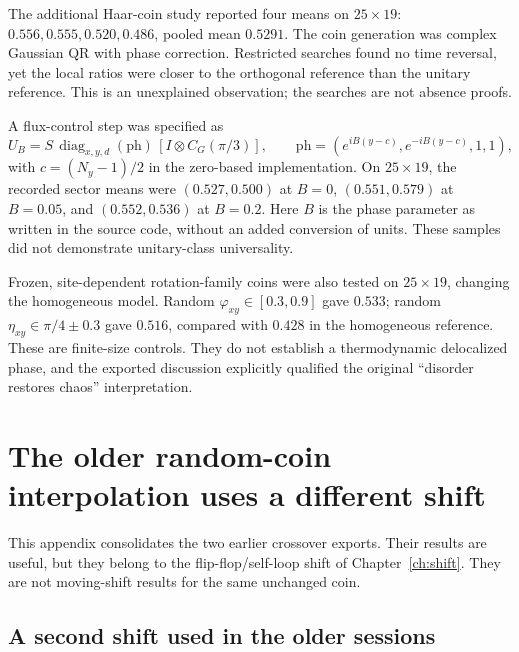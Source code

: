 \documentclass[11pt,a4paper,oneside]{report}
\newcommand{\Id}{I}
\newcommand{\diag}{\operatorname{diag}}
\numberwithin{equation}{chapter}
\begin{document}
The additional Haar-coin study reported four means on \(25\times19\):
\(0.556,0.555,0.520,0.486\), pooled mean \(0.5291\). The coin
generation was complex Gaussian QR with phase correction. Restricted
searches found no time reversal, yet the local ratios were closer
to the orthogonal reference than the unitary reference. This is an
unexplained observation; the searches are not absence proofs.

A flux-control step was specified as
\begin{equation}
U_B=S\,\diag_{x,y,d}(\mathrm{ph})\,[\Id\otimes C_G(\pi/3)],
\qquad
\mathrm{ph}=(e^{iB(y-c)},e^{-iB(y-c)},1,1),
\end{equation}
with \(c=(N_y-1)/2\) in the zero-based implementation. On
\(25\times19\), the recorded sector means were
\((0.527,0.500)\) at \(B=0\),
\((0.551,0.579)\) at \(B=0.05\), and
\((0.552,0.536)\) at \(B=0.2\). Here \(B\) is the phase parameter
as written in the source code, without an added conversion of units.
These samples did not demonstrate unitary-class universality.

Frozen, site-dependent rotation-family coins were also tested on
\(25\times19\), changing the homogeneous model. Random
\(\varphi_{xy}\in[0.3,0.9]\) gave \(0.533\); random
\(\eta_{xy}\in\pi/4\pm0.3\) gave \(0.516\), compared with
\(0.428\) in the homogeneous reference. These are finite-size
controls. They do not establish a thermodynamic delocalized phase,
and the exported discussion explicitly qualified the original
``disorder restores chaos'' interpretation.


\chapter{The older random-coin interpolation uses a different shift}
\label{app:legacy}

This appendix consolidates the two earlier crossover exports. Their
results are useful, but they belong to the flip-flop/self-loop shift
of Chapter~\ref{ch:shift}. They are not moving-shift results for the
same unchanged coin.

\section{A second shift used in the older sessions}
\end{document}
